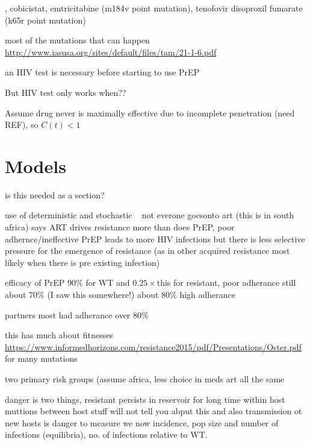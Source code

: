 \documentclass[DIV=15]{scrartcl}
\begin{document}
, cobicistat, emtricitabine (m184v point mutation), tenofovir disoproxil fumarate (k65r point mutation)


most of the mutations that can happen \url{http://www.iasusa.org/sites/default/files/tam/21-1-6.pdf}


an HIV test is necessary before starting to use PrEP

But HIV test only works when??


Assume drug never is maximally effective due to incomplete penetration (need REF), so $C(t)<1$
\fi


\iffalse

\section{Models}
is this needed as a section?

use of  deterministic and stochastic ~\cite{abbas2013} not everone goesonto art (this is in south africa) says ART drives resistance more than does PrEP, poor adhernce/ineffective PrEP leads to more HIV infections but there is less  selective pressure for the emergence of  resistance (as in other acquired resistance most likely when there is pre existing infection)

efficacy of PrEP $90\%$ for WT and $0.25\times$this for resistant, poor adherance still  about $70\%$ (I saw this somewhere!) about $80\%$ high adherance

partners most had adherance over $80\%$

this has much about fitnesses \url{https://www.informedhorizons.com/resistance2015/pdf/Presentations/Oster.pdf} for many mutations 



two primary risk groups (assume africa, less choice in meds art all the same


danger is two things, resistant persists in reservoir for long time within host muttions between host stuff will not tell you abput this and also transmission ot new hosts is danger to measure we now incidence, pop size and number of infections (equilibria), no. of infections relative to WT.
\end{document}
